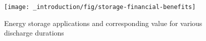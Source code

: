 \begin{figure}\centering
	\texttt{[image: \_introduction/fig/storage-financial-benefits]}
	\caption{Energy storage applications and corresponding value for various discharge durations \cite{Rubia2015}}
	\label{ch-introduction:fig:storage-financial-benefits}
\end{figure}